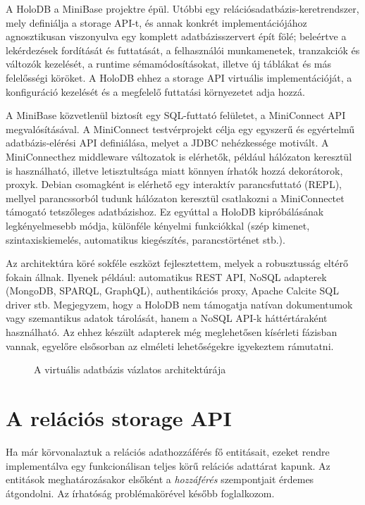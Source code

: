 \documentclass[
    parspace,
    noindent,
    nohyp,
]{elteiktdk}[2023/04/10]
\begin{document}
A HoloDB a MiniBase projektre épül.
Utóbbi egy relációsadatbázis-keretrendszer, mely definiálja a storage API-t,
és annak konkrét implementációjához agnosztikusan viszonyulva
egy komplett adatbázisszervert épít fölé;
beleértve a lekérdezések fordítását és futtatását,
a felhasználói munkamenetek, tranzakciók és változók kezelését,
a runtime sémamódosításokat, illetve új táblákat és más felelősségi köröket.
A HoloDB ehhez a storage API virtuális implementációját,
a konfiguráció kezelését
és a megfelelő futtatási környezetet adja hozzá.

A MiniBase közvetlenül biztosít egy SQL-futtató felületet, a MiniConnect API megvalósításával.
A MiniConnect testvérprojekt célja egy egyszerű és egyértelmű adatbázis-elérési API definiálása,
melyet a JDBC nehézkessége motivált.
A MiniConnecthez middleware változatok is elérhetők, például hálózaton keresztül is használható,
illetve letisztultsága miatt könnyen írhatók hozzá dekorátorok, proxyk.
Debian csomagként is elérhető egy interaktív parancsfuttató (REPL),
mellyel parancssorból tudunk hálózaton keresztül csatlakozni a MiniConnectet támogató tetszőleges adatbázishoz.
Ez egyúttal a HoloDB kipróbálásának legkényelmesebb módja,
különféle kényelmi funkciókkal
(szép kimenet, szintaxiskiemelés, automatikus kiegészítés, parancstörténet stb.).

Az architektúra köré sokféle eszközt fejlesztettem,
melyek a robusztusság eltérő fokain állnak.
Ilyenek például: automatikus REST API, NoSQL adapterek (MongoDB, SPARQL, GraphQL), authentikációs proxy, Apache Calcite\cite{Begoli2018ApacheCalcite,SoftwareApacheCalcite} SQL driver stb.
Megjegyzem, hogy a HoloDB nem támogatja natívan dokumentumok vagy szemantikus adatok tárolását,
hanem a NoSQL API-k háttértáraként használható.
Az ehhez készült adapterek még meglehetősen kísérleti fázisban vannak,
egyelőre elsősorban az elméleti lehetőségekre igyekeztem rámutatni.

\begin{figure}[H]
\centering

\caption{A virtuális adatbázis vázlatos architektúrája}
\end{figure}


\section{A relációs storage API}

Ha már körvonalaztuk a relációs adathozzáférés fő entitásait,
ezeket rendre implementálva egy funkcionálisan teljes körű relációs adattárat kapunk.
Az entitások meghatározásakor elsőként a \textit{hozzáférés} szempontjait érdemes átgondolni.
Az írhatóság problémakörével később foglalkozom.
\end{document}
